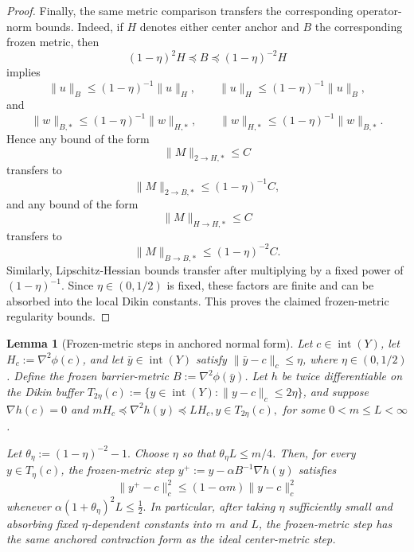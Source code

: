 \documentclass{article}
\newtheorem{lemma}{Lemma}
\begin{document}
\begin{proof}
Finally, the same metric comparison transfers the corresponding operator-norm bounds. Indeed, if
\(H\) denotes either center anchor and \(B\) the corresponding frozen metric, then
\[
(1-\eta)^2H\preceq B\preceq (1-\eta)^{-2}H
\]
implies
\[
\|u\|_B\le (1-\eta)^{-1}\|u\|_H,
\qquad
\|u\|_H\le (1-\eta)^{-1}\|u\|_B,
\]
and
\[
\|w\|_{B,*}\le (1-\eta)^{-1}\|w\|_{H,*},
\qquad
\|w\|_{H,*}\le (1-\eta)^{-1}\|w\|_{B,*}.
\]
Hence any bound of the form
\[
\|M\|_{2\to H,*}\le C
\]
transfers to
\[
\|M\|_{2\to B,*}\le (1-\eta)^{-1}C,
\]
and any bound of the form
\[
\|M\|_{H\to H,*}\le C
\]
transfers to
\[
\|M\|_{B\to B,*}\le (1-\eta)^{-2}C.
\]
Similarly, Lipschitz-Hessian bounds transfer after multiplying by a fixed power of
\((1-\eta)^{-1}\). Since \(\eta\in(0,1/2)\) is fixed, these factors are finite and can be absorbed into
the local Dikin constants. This proves the claimed frozen-metric regularity bounds.
\end{proof}




\begin{lemma}[Frozen-metric steps in anchored normal form]
\label{lem:frozen_metric_anchored_contraction}
Let \(c\in\operatorname{int}(Y)\), let \(H_c:=\nabla^2\phi(c)\), and let
\(\bar y\in\operatorname{int}(Y)\) satisfy
\(\|\bar y-c\|_{c}\le \eta\), where \(\eta\in(0,1/2)\). Define the frozen barrier-metric
\(B:=\nabla^2\phi(\bar y)\). Let \(h\) be twice differentiable on the Dikin buffer
\(T_{2\eta}(c):=\{y\in\operatorname{int}(Y):\|y-c\|_c\le 2\eta\}\), and suppose
\(\nabla h(c)=0\) and \( m H_c\preceq \nabla^2 h(y)\preceq L H_c,
y\in T_{2\eta}(c), 
\)
 for some \(0<m\le L<\infty\).
 
Let \(
\theta_\eta:=(1-\eta)^{-2}-1.\) Choose $\eta$ so that \(\theta_\eta L\le m/4\). Then, for every \(y\in T_{\eta}(c)\), the frozen-metric step
\(
y^+ := y-\alpha B^{-1}\nabla h(y)\)
satisfies
\[
\|y^+-c\|_c^2
\le
(1-\alpha m)\|y-c\|_c^2
\]
whenever \(
\alpha(1+\theta_\eta)^2L\le \frac12 .\)
In particular, after taking \(\eta\) sufficiently small and absorbing fixed \(\eta\)-dependent constants
into \(m\) and \(L\), the frozen-metric step has the same anchored contraction form as the ideal
center-metric step.
\end{lemma}
\end{document}
